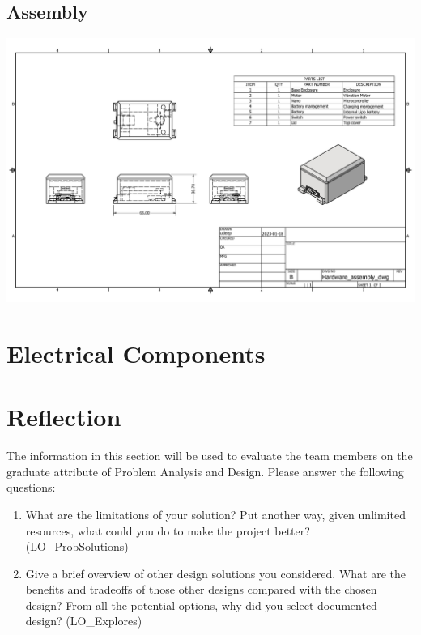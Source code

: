 \documentclass[12pt, titlepage]{article}
\begin{document}
\begin{appendices}
\subsection{Assembly}
	\label{appendix:hardware:assembly}

  \includegraphics[width=\textwidth,height=\textheight,keepaspectratio]{Assembly_drawing.pdf}

  \section{Electrical Components}
  \label{appendix:electrical}
  
  \section{Reflection}
  \label{appendix:reflection}
  
  The information in this section will be used to evaluate the team members on the
  graduate attribute of Problem Analysis and Design.  Please answer the following questions:
  
  \begin{enumerate}
    \item What are the limitations of your solution?  Put another way, given
    unlimited resources, what could you do to make the project better? (LO\_ProbSolutions)
    \item Give a brief overview of other design solutions you considered.  What
    are the benefits and tradeoffs of those other designs compared with the chosen
    design?  From all the potential options, why did you select documented design?
    (LO\_Explores)
  \end{enumerate}
  
  \end{appendices}
\end{document}
